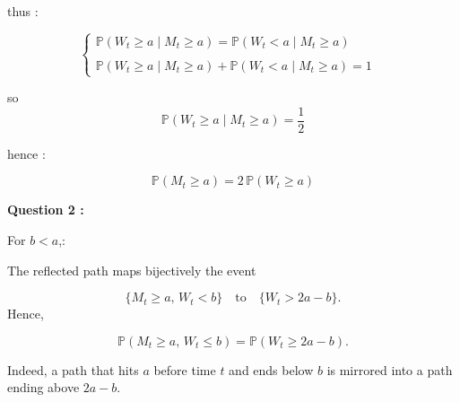 thus : 

\[
\begin{cases}
\mathbb{P}(W_t \ge a \mid M_t \ge a) = \mathbb{P}(W_t < a \mid M_t \ge a) \\
&\\
\mathbb{P}(W_t \ge a \mid M_t \ge a) + \mathbb{P}(W_t < a \mid M_t \ge a) = 1
\end{cases}
\]

so 
\[
\mathbb{P}(W_t \ge a \mid M_t \ge a) = \frac{1}{2}
\]

hence : 

\[
\boxed{
\mathbb{P}(M_t \ge a) = 2\,\mathbb{P}(W_t \ge a) 
}
\]


\textbf{Question 2 : }

For \(b < a\),:

The reflected path maps bijectively the event

\[
\{ M_t \ge a,\, W_t < b \}
\quad \text{to} \quad
\{ W_t > 2a -b  \}.
\]
Hence,

\[
\mathbb{P}(M_t \ge a,\, W_t \le b)
= \mathbb{P}(W_t \ge 2a - b).
\]

Indeed, a path that hits \(a\) before time \(t\) and ends below \(b\)
is mirrored into a path ending above \(2a - b\).







